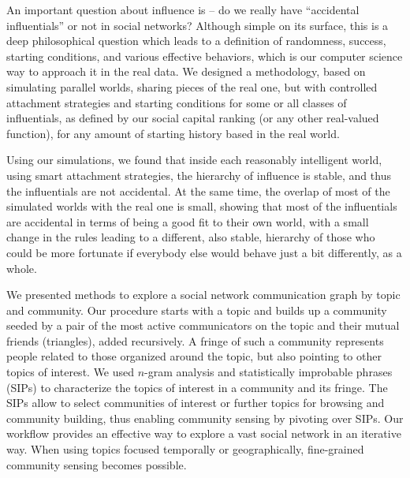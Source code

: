 \documentclass[10pt,oneside]{memoir}
\begin{document}
An important question about influence is -- do we really have ``accidental influentials'' or not in social networks?  Although simple on its surface, this is a deep philosophical question which leads to a definition of randomness, success, starting conditions, and various effective behaviors, which is our computer science way to approach it in the real data.  We designed a methodology, based on simulating parallel worlds, sharing pieces of the real one, but with controlled attachment strategies and starting conditions for some or all classes of influentials, as defined by our social capital ranking (or any other real-valued function), for any amount of starting history based in the real world.  


Using our simulations, we found that inside each reasonably intelligent world, using smart attachment strategies, the hierarchy of influence is stable, and thus the influentials are not accidental.  At the same time, the overlap of most of the simulated worlds with the real one is small, showing that most of the influentials are accidental in terms of being a good fit to their own world, with a small change in the rules leading to a different, also stable, hierarchy of those who could be more fortunate if everybody else would behave just a bit differently, as a whole.


We presented methods to explore a social network communication graph by topic and community. Our procedure starts with a topic and builds up a community seeded by a pair of the most active communicators on the topic and their mutual friends (triangles), added recursively. A fringe of such a community represents people related to those organized around the topic, but also pointing to other topics of interest. We used $n$-gram analysis and statistically improbable phrases (SIPs) to characterize the topics of interest in a community and its fringe. The SIPs allow to select communities of interest or further topics for browsing and community building, thus enabling community sensing by pivoting over SIPs. Our workflow provides an effective way to explore a vast social network in an iterative way. When using topics focused temporally or geographically, fine-grained community sensing becomes possible.
\end{document}
